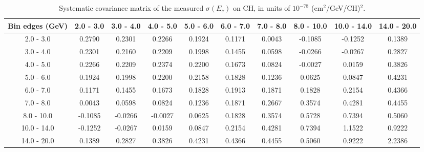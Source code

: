 \documentclass[aps,prl,twocolumn,superscriptaddress,nofootinbib]{revtex4-1}
\begin{document}
\begin{table}[h!]
  \centering
  \caption{Systematic covariance matrix of the measured $\sigma(E_{\nu})$ on CH, in units of $10^{-78}$ (cm$^{2}$/GeV/CH)$^{2}$.}
    \begin{tabular}{c||ccccccccc}
      Bin edges (GeV) & 2.0 - 3.0 & 3.0 - 4.0 & 4.0 - 5.0 & 5.0 - 6.0 & 6.0 - 7.0 & 7.0 - 8.0 & 8.0 - 10.0 & 10.0 - 14.0 & 14.0 - 20.0 \\
\hline \hline
        2.0 - 3.0 &  0.2790 &  0.2301 &  0.2266 &  0.1924 &  0.1171 &  0.0043 & -0.1085 & -0.1252 &  0.1389 \\
        3.0 - 4.0 &  0.2301 &  0.2160 &  0.2209 &  0.1998 &  0.1455 &  0.0598 & -0.0266 & -0.0267 &  0.2827 \\
        4.0 - 5.0 &  0.2266 &  0.2209 &  0.2374 &  0.2200 &  0.1673 &  0.0824 & -0.0027 &  0.0159 &  0.3826 \\
        5.0 - 6.0 &  0.1924 &  0.1998 &  0.2200 &  0.2158 &  0.1828 &  0.1236 &  0.0625 &  0.0847 &  0.4231 \\
        6.0 - 7.0 &  0.1171 &  0.1455 &  0.1673 &  0.1828 &  0.1913 &  0.1871 &  0.1828 &  0.2154 &  0.4366 \\
        7.0 - 8.0 &  0.0043 &  0.0598 &  0.0824 &  0.1236 &  0.1871 &  0.2667 &  0.3574 &  0.4281 &  0.4455 \\
       8.0 - 10.0 & -0.1085 & -0.0266 & -0.0027 &  0.0625 &  0.1828 &  0.3574 &  0.5728 &  0.7394 &  0.5060 \\
      10.0 - 14.0 & -0.1252 & -0.0267 &  0.0159 &  0.0847 &  0.2154 &  0.4281 &  0.7394 &  1.1522 &  0.9222 \\
      14.0 - 20.0 &  0.1389 &  0.2827 &  0.3826 &  0.4231 &  0.4366 &  0.4455 &  0.5060 &  0.9222 &  2.2386 \\
    \end{tabular}
  \label{tablecov:CH_Systematic_Enu}
\end{table}
\end{document}
